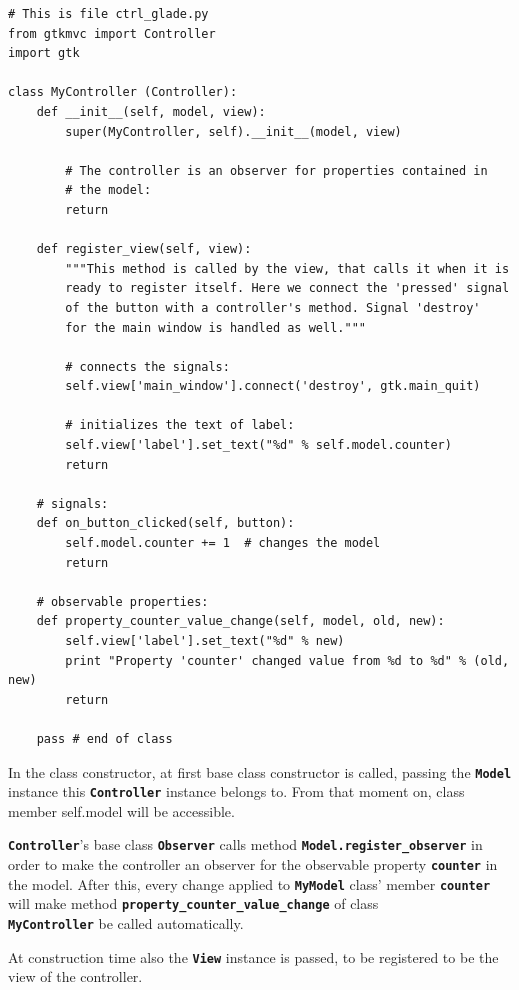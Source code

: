 \documentclass{article}
\newcommand{\codename}[1]{\texttt{\bfseries \textcolor {codecolor}{#1}}\xspace}
\newcommand{\codesize}{\small } %
\begin{document}
{ \codesize 
\begin{verbatim}   
# This is file ctrl_glade.py
from gtkmvc import Controller
import gtk

class MyController (Controller):
    def __init__(self, model, view):
        super(MyController, self).__init__(model, view)

        # The controller is an observer for properties contained in
        # the model:
        return

    def register_view(self, view):
        """This method is called by the view, that calls it when it is
        ready to register itself. Here we connect the 'pressed' signal
        of the button with a controller's method. Signal 'destroy'
        for the main window is handled as well."""

        # connects the signals:
        self.view['main_window'].connect('destroy', gtk.main_quit)
        
        # initializes the text of label:
        self.view['label'].set_text("%d" % self.model.counter)
        return
       
    # signals:
    def on_button_clicked(self, button):
        self.model.counter += 1  # changes the model
        return

    # observable properties:
    def property_counter_value_change(self, model, old, new):
        self.view['label'].set_text("%d" % new)
        print "Property 'counter' changed value from %d to %d" % (old, new)
        return
    
    pass # end of class
\end{verbatim}
} 

In the class constructor, at first base class constructor is called,
passing the \codename{Model} instance this \codename{Controller}
instance belongs to. From that moment on, class member self.model will
be accessible. 

\codename{Controller}'s base class \codename{Observer} calls method
\codename{Model.register\_observer} in order to make the controller
an observer for the observable property \codename{counter} in the
model. After this, every change applied to \codename{MyModel} class'
member \codename{counter} will make method
\codename{property\_counter\_value\_change} of class \\
\codename{MyController} be called automatically.

At construction time also the \codename{View} instance is passed,
to be registered to be the view of the controller.
\end{document}

